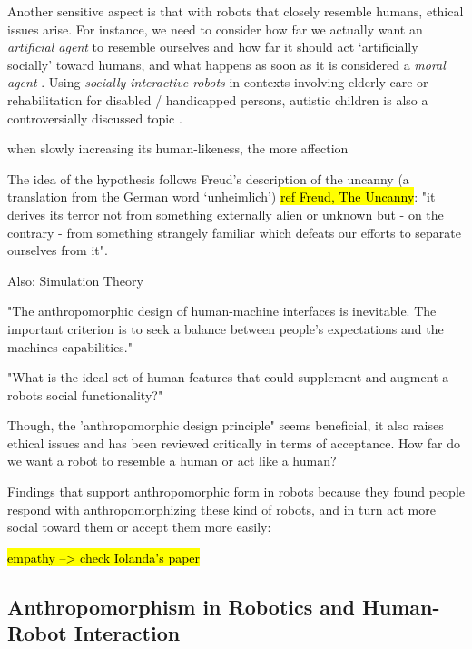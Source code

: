 \documentclass{frontiersSCNS} %
\begin{document}
Another sensitive aspect is that with robots that closely resemble humans,
ethical issues arise. For instance, we need to consider how far we actually want
an \textit{artificial agent} to resemble ourselves and how far it should act
`artificially socially' toward humans, and what happens as soon as it is
considered a \textit{moral agent} \cite{sullins_when_2006}. Using
\textit{socially interactive robots} in contexts involving elderly care or
rehabilitation for disabled / handicapped persons, autistic children is also a
controversially discussed topic \cite{robins_robots_2005}.


when slowly increasing its human-likeness, the more affection 

The idea of the hypothesis follows Freud's description of the uncanny (a
translation from the German word `unheimlich') \hl{ref Freud, The Uncanny}: "it
derives its terror not from something externally alien or unknown but - on the
contrary - from something strangely familiar which defeats our efforts to
separate ourselves from it". \cite{hegel_understanding_2008}

	Also: Simulation Theory

	

"The anthropomorphic design of human-machine interfaces is inevitable. The
important criterion is to seek a balance between people's expectations and the
machines capabilities." \cite{duffy_anthropomorphism_2002}

"What is the ideal set of human features that could supplement and augment a
robots  social functionality?" \cite{duffy_anthropomorphism_2002}


Though, the 'anthropomorphic design principle" seems beneficial, it also raises
ethical issues and has been reviewed critically in terms of acceptance. How far
do we want a robot to resemble a human or act like a human?

Findings that support anthropomorphic form in robots because they found people
respond with anthropomorphizing these kind of robots, and in turn act more
social toward them or accept them more easily:

	\hl{empathy --> check Iolanda's paper}

	 

\subsection*{Anthropomorphism in Robotics and Human-Robot Interaction}
\label{sec:anthropomorphism-robotics}
\end{document}
